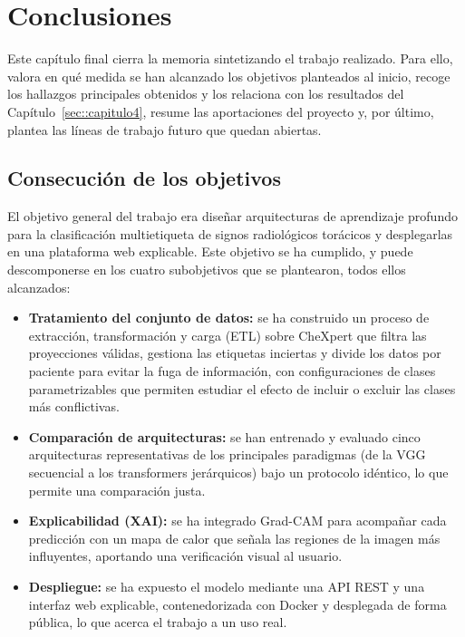 %
\chapter{Conclusiones}
\label{sec::capitulo8}

Este capítulo final cierra la memoria sintetizando el trabajo realizado. Para ello,
valora en qué medida se han alcanzado los objetivos planteados al inicio, recoge los
hallazgos principales obtenidos y los relaciona con los resultados del
Capítulo~\ref{sec::capitulo4}, resume las aportaciones del proyecto y, por último,
plantea las líneas de trabajo futuro que quedan abiertas.

\section{Consecución de los objetivos}
\label{sec::concl_objetivos}

El objetivo general del trabajo era diseñar arquitecturas de aprendizaje profundo para
la clasificación multietiqueta de signos radiológicos torácicos y desplegarlas en una
plataforma web explicable. Este objetivo se ha cumplido, y puede descomponerse en los
cuatro subobjetivos que se plantearon, todos ellos alcanzados:

\begin{itemize}
  \item \textbf{Tratamiento del conjunto de datos:} se ha construido un proceso de
        extracción, transformación y carga (ETL) sobre CheXpert que filtra las
        proyecciones válidas, gestiona las etiquetas inciertas y divide los datos por
        paciente para evitar la fuga de información, con configuraciones de clases
        parametrizables que permiten estudiar el efecto de incluir o excluir las clases
        más conflictivas.
  \item \textbf{Comparación de arquitecturas:} se han entrenado y evaluado cinco
        arquitecturas representativas de los principales paradigmas (de la VGG
        secuencial a los transformers jerárquicos) bajo un protocolo idéntico, lo que
        permite una comparación justa.
  \item \textbf{Explicabilidad (XAI):} se ha integrado Grad-CAM para acompañar cada
        predicción con un mapa de calor que señala las regiones de la imagen más
        influyentes, aportando una verificación visual al usuario.
  \item \textbf{Despliegue:} se ha expuesto el modelo mediante una API REST y una
        interfaz web explicable, contenedorizada con Docker y desplegada de forma
        pública, lo que acerca el trabajo a un uso real.
\end{itemize}

